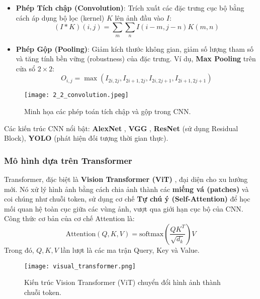 \begin{itemize}
    \item \textbf{Phép Tích chập (Convolution)}: Trích xuất các đặc trưng cục bộ bằng cách áp dụng bộ lọc (kernel) $K$ lên ảnh đầu vào $I$:
    \begin{equation}
    (I * K)(i, j) = \sum_{m} \sum_{n} I(i-m, j-n) K(m, n)
    \end{equation}
    \item \textbf{Phép Gộp (Pooling)}: Giảm kích thước không gian, giảm số lượng tham số và tăng tính bền vững (robustness) của đặc trưng. Ví dụ, \textbf{Max Pooling} trên cửa sổ $2 \times 2$:
    \begin{equation}
    O_{i,j} = \max \left( I_{2i, 2j}, I_{2i+1, 2j}, I_{2i, 2j+1}, I_{2i+1, 2j+1} \right)
    \end{equation}
\end{itemize}

\begin{figure}[h]
    \centering
    \texttt{[image: 2\_2\_convolution.jpeg]}
    \caption{Minh họa các phép toán tích chập và gộp trong CNN.}
    \label{fig:cnn_ops}
\end{figure}

Các kiến trúc CNN nổi bật: \textbf{AlexNet} \cite{krizhevsky2012imagenet}, \textbf{VGG} \cite{simonyan2014very}, \textbf{ResNet} \cite{he2016deep} (sử dụng Residual Block), \textbf{YOLO} \cite{redmon2016you} (phát hiện đối tượng thời gian thực).

\subsubsection{Mô hình dựa trên Transformer}
Transformer, đặc biệt là \textbf{Vision Transformer (ViT)} \cite{dosovitskiy2021image}, đại diện cho xu hướng mới. Nó xử lý hình ảnh bằng cách chia ảnh thành các \textbf{miếng vá (patches)} và coi chúng như chuỗi token, sử dụng cơ chế \textbf{Tự chú ý (Self-Attention)} để học mối quan hệ toàn cục giữa các vùng ảnh, vượt qua giới hạn cục bộ của CNN. Công thức cơ bản của cơ chế Attention là:
\begin{equation}
\text{Attention}(Q, K, V) = \text{softmax}\left(\frac{QK^T}{\sqrt{d_k}}\right)V
\end{equation}
Trong đó, $Q, K, V$ lần lượt là các ma trận Query, Key và Value.

\begin{figure}[h]
    \centering
    \texttt{[image: visual\_transformer.png]}
    \caption{Kiến trúc Vision Transformer (ViT) chuyển đổi hình ảnh thành chuỗi token.}
    \label{fig:vit_arch}
\end{figure}

